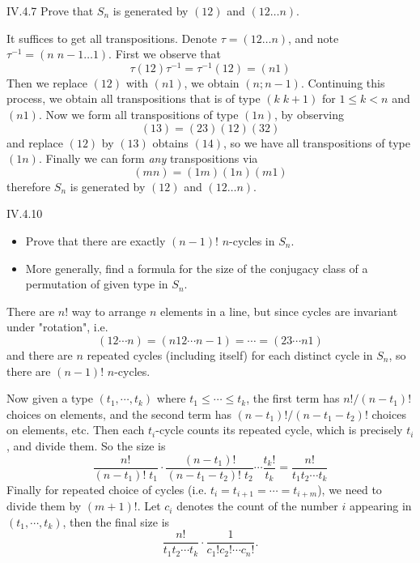 \begin{problem}{IV.4.7}
Prove that $S_n$ is generated by $(12)$ and $(12\dotsc n)$.
\end{problem}
\begin{pf}
It suffices to get all transpositions. Denote $\tau = (12\dotsc n)$, and note $\tau^{-1}=(n \; n-1 \dotsc 1)$. First we observe that 
\[
\tau(12)\tau^{-1} = \tau^{-1}(12) = (n 1)
\]
Then we replace $(12)$ with $(n 1)$, we obtain $(n ; n-1)$. Continuing this process, we obtain all transpositions that is of type $(k \; k+1)$ for $1 \leq k < n$ and $(n 1)$. Now we form all transpositions of type $(1 n)$, by observing
\[
(1 3) = (2 3)(1 2)(3 2)	
\]
and replace $(1 2)$ by $(1 3)$ obtains $(1 4)$, so we have all transpositions of type $(1 n)$. Finally we can form \emph{any} transpositions via
\[
(m n) = (1 m)(1 n)(m 1)	
\]
therefore $S_n$ is generated by $(12)$ and $(12\dotsc n)$.
\end{pf}

\begin{problem}{IV.4.10} \el
\begin{itemize}
\setlength\itemsep{0pt}
\item Prove that there are exactly $(n-1)!$ $n$-cycles in $S_n$.
\item More generally, find a formula for the size of the conjugacy class of a permutation of given type in $S_n$.
\end{itemize}
\end{problem}
\begin{pf}
There are $n!$ way to arrange $n$ elements in a line, but since cycles are invariant under "rotation", i.e.
\[
(1 2 \cdots n) = (n 1 2 \cdots n-1) = \cdots = (2 3 \cdots n 1)	
\]
and there are $n$ repeated cycles (including itself) for each distinct cycle in $S_n$, so there are $(n-1)!$ $n$-cycles.

Now given a type $(t_1,\cdots ,t_k)$ where $t_1 \leq \cdots \leq t_k$, the first term has $n!/(n-t_1)!$ choices on elements, and the second term has $(n-t_1)!/(n-t_1-t_2)!$ choices on elements, etc. Then each $t_i$-cycle counts its repeated cycle, which is precisely $t_i$, and divide them. So the size is
\[
\frac{n!}{(n-t_1)!\;t_1} \cdot \frac{(n-t_1)!}{(n-t_1-t_2)!\;t_2} \cdots \frac{t_k!}{t_k} = \frac{n!}{t_1 t_2 \cdots t_k}
\]
Finally for repeated choice of cycles (i.e. $t_i = t_{i+1} = \cdots = t_{i+m}$), we need to divide them by $(m+1)!$. Let $c_i$ denotes the count of the number $i$ appearing in $(t_1,\cdots ,t_k)$, then the final size is
\[
\frac{n!}{t_1 t_2 \cdots t_k} \cdot \frac{1}{c_1! c_2! \cdots c_n!}.
\]
\end{pf}

